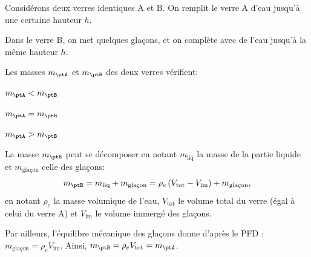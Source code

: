 
\finEntrainement






\hauteurLargeurCadreReponse		{7mm}{1.5cm}
\initialisationEntrainement

Considérons deux verres identiques A et B. On remplit le verre A d'eau jusqu'à une certaine hauteur $h$. 

\debutEntrainement


\begin{enonce}
Dans le verre B, on met quelques glaçons, et on complète avec de l'eau jusqu'à la même hauteur $h$. 

Les masses $m_{\ptA}$ et $m_{\ptB}$ des deux verres vérifient:
	\begin{listeQCM3Colonnes}
	\item $m_{\ptA}<m_{\ptB}$
	\item $m_{\ptA}=m_{\ptB}$
	\item $m_{\ptA}>m_{\ptB}$
	\end{listeQCM3Colonnes}
\end{enonce}

\reponse{\reponseB{}}

\begin{corrigeNewpage}
La masse $m_{\ptB}$ peut se décomposer en notant $m_{\text{liq}}$ la masse de la partie liquide et $m_{\text{glaçon}}$ celle des glaçons:
\[
m_{\ptB}  =m_{\text{liq}}+m_{\text{glaçon}} =\rho_{e}\left(V_{\text{tot}}-V_{\text{im}}\right)+m_{\text{glaçon}},
\]
 en notant $\rho_{e}$ la masse volumique de l'eau, $V_{\text{tot}}$ le volume total du verre (égal à celui du verre A) et $V_{\text{im}}$
le volume immergé des glaçons. 

Par ailleurs, l'équilibre mécanique des glaçons donne d'après le PFD : $m_{\text{glaçon}}=\rho_{e}V_{\text{im}}$. Ainsi, $m_{\ptB}=\rho_{e}V_\text{tot}=m_{\ptA}$.
\end{corrigeNewpage}

